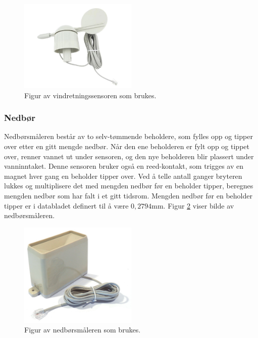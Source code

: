 \begin{figure}[H]
    \centering
    \includegraphics[width=0.5\textwidth]{implementering/vindretning.png}
    \caption{Figur av vindretningssensoren som brukes.}
    \label{fig:vindretning}
\end{figure}


\subsubsection{Nedbør}\label{sec:impl:vaer:regn}

Nedbørsmåleren består av to selv-tømmende beholdere, som fylles opp og tipper over etter en gitt mengde nedbør. 
Når den ene beholderen er fylt opp og tippet over, renner vannet ut under sensoren, og den nye beholderen blir plassert under vanninntaket. 
Denne sensoren bruker også en reed-kontakt, som trigges av en magnet hver gang en beholder tipper over. 
Ved å telle antall ganger bryteren lukkes og multiplisere det med mengden nedbør før en beholder tipper, beregnes mengden nedbør som har falt i et gitt tidsrom. 
Mengden nedbør før en beholder tipper er i databladet\cite{weather} definert til å være $0,2794$mm. Figur \ref{fig:impl:vaer:regn} viser bilde av nedbørsmåleren.

\begin{figure}[H]
    \centering
    \includegraphics[width=0.5\textwidth]{implementering/rain_gauge.jpg}
    \caption{Figur av nedbørsmåleren som brukes.}
    \label{fig:impl:vaer:regn}
\end{figure}

